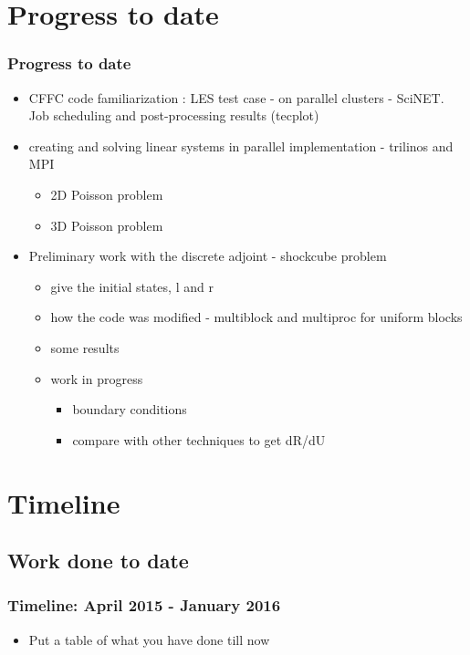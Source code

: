 \documentclass{beamer}
\begin{document}
\section[Progress]{Progress to date}

\begin{frame}[allowframebreaks]
\frametitle{Progress to date}

\begin{itemize}
\item CFFC code familiarization : LES test case - on parallel clusters - SciNET. Job scheduling and post-processing results (tecplot)
\item creating and solving linear systems in parallel implementation - trilinos and MPI
\begin{itemize}
\item 2D Poisson problem
\item  3D Poisson problem
\end{itemize}
\item Preliminary work with the discrete adjoint - shockcube problem
\begin{itemize}
\item give the initial states, l and r
\item how the code was modified - multiblock and multiproc for uniform blocks
\item some results
\item work in progress
\begin{itemize}
\item boundary conditions
\item compare with other techniques to get dR/dU
\end{itemize}
\end{itemize}
\end{itemize}
\end{frame}


\section[Timeline]{Timeline}

\subsection[Present]{Work done to date}
\begin{frame}[allowframebreaks]
\frametitle{Timeline: April 2015  - January 2016}
\begin{itemize}
\item Put a table of what you have done till now
\end{itemize}
\end{frame}
\end{document}
